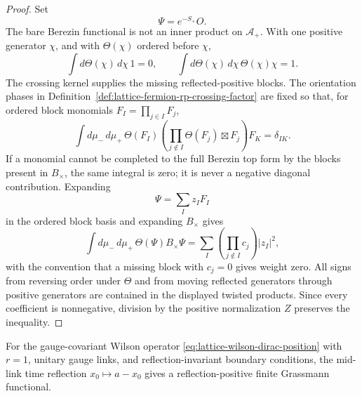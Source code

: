 \begin{proof}
Set
\[
  \Psi=e^{-S_+}O .
\]
The bare Berezin functional is not an inner product on \(\mathcal A_+\).  With
one positive generator \(\chi\), and with \(\Theta(\chi)\) ordered before
\(\chi\),
\[
  \int d\Theta(\chi)\,d\chi\,1=0,
  \qquad
  \int d\Theta(\chi)\,d\chi\,\Theta(\chi)\chi=1 .
\]
The crossing kernel supplies the missing reflected-positive blocks.  The
orientation phases in Definition~\ref{def:lattice-fermion-rp-crossing-factor}
are fixed so that, for ordered block monomials \(F_I=\prod_{j\in I}F_j\),
\[
  \int d\mu_-\,d\mu_+\,
  \Theta(F_I)
  \left(\prod_{j\notin I}\Theta(F_j)\boxtimes F_j\right)
  F_K
  =
  \delta_{IK}.
\]
If a monomial cannot be completed to the full Berezin top form by the blocks
present in \(B_\times\), the same integral is zero; it is never a negative
diagonal contribution.  Expanding
\[
  \Psi=\sum_I z_I F_I
\]
in the ordered block basis and expanding \(B_\times\) gives
\[
  \int d\mu_-\,d\mu_+\,
  \Theta(\Psi)B_\times\Psi
  =
  \sum_I
  \left(\prod_{j\notin I}c_j\right)|z_I|^2 ,
\]
with the convention that a missing block with \(c_j=0\) gives weight zero.
All signs from reversing order under \(\Theta\) and from moving reflected
generators through positive generators are contained in the displayed twisted
products.  Since every coefficient is nonnegative, division by the positive
normalization \(Z\) preserves the inequality.
\end{proof}

\begin{proposition}[Wilson \(r=1\) mid-link reflection positivity]
\label{prop:lattice-fermion-midlink-free-rp}
For the gauge-covariant Wilson operator
\eqref{eq:lattice-wilson-dirac-position} with \(r=1\), unitary gauge links,
and reflection-invariant boundary conditions, the mid-link time reflection
\(x_0\mapsto a-x_0\) gives a reflection-positive finite Grassmann functional.
\end{proposition}

